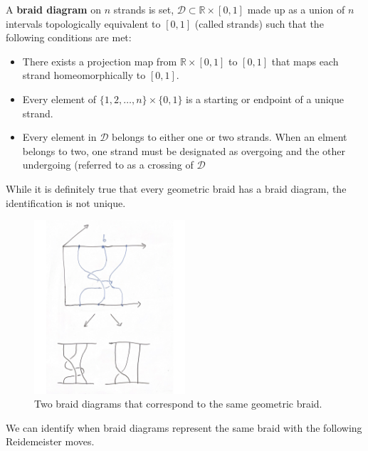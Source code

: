 \documentclass[compress,aspectratio=169,10pt,usenames,dvipsnames]{beamer}
\newcommand{\R}{\mathbb{R}}
\begin{document}
\begin{frame}
\vfill
\begin{definition}
	A \textbf{braid diagram} on $n$ strands is set, $\mathcal{D}\subset \R\times [0,1]$ made up as a union of $n$ intervals topologically equivalent to $[0,1]$ (called strands) such that the following conditions are met:
\begin{itemize}
	\item There exists a projection map from $\R\times [0,1]$ to $[0,1]$ that maps each strand homeomorphically to $[0,1]$.
	\item Every element of $\{1,2,\hdots,n\}\times\{0,1\}$ is a starting or endpoint of a unique strand.
	\item Every element in $\mathcal{D}$ belongs to either one or two strands. When an elment belongs to two, one strand must be designated as overgoing and the other undergoing (referred to as a crossing of $\mathcal{D}$
\end{itemize}
\end{definition}
\vfill
While it is definitely true that every geometric braid has a braid diagram, the identification is not unique.
\end{frame}
%
%
\begin{frame}
\vfill
\begin{figure}[H]
	\centering
	\includegraphics[width=0.5\textwidth]{requiv.png}
	\caption{Two braid diagrams that correspond to the same geometric braid.}
\end{figure}
\vfill
We can identify when braid diagrams represent the same braid with the following Reidemeister moves.
\end{frame}
\end{document}
